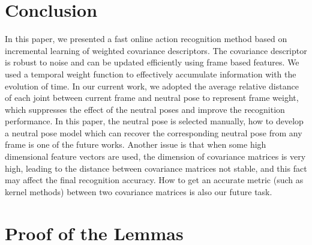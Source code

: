 \documentclass[sigconf]{acmart}
\begin{document}
\section{Conclusion}\label{conclusion}
In this paper, we presented a fast online action recognition method based on incremental learning of weighted covariance descriptors. The covariance descriptor is robust to noise and can be updated efficiently using frame based features. We used a temporal weight function to effectively accumulate information with the evolution of time. In our current work, we adopted the average relative distance of each joint between current frame and neutral pose to represent frame weight, which suppresses the effect of the neutral poses and improve the recognition performance. In this paper, the neutral pose is selected manually, how to develop a neutral pose model which can recover the corresponding neutral pose from any frame is one of the future works. Another issue is that when some high dimensional feature vectors are used, the dimension of covariance matrices is very high, leading to the distance between covariance matrices not stable, and this fact may affect the final recognition accuracy. How to get an accurate metric (such as kernel methods) between two covariance matrices is also our future task.




\appendix

\section{Proof of the Lemmas}
\end{document}
